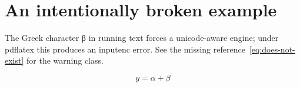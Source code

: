 \documentclass{article}
\begin{document}
\section{An intentionally broken example}

The Greek character β in running text forces a unicode-aware engine;
under pdflatex this produces an inputenc error.  See the missing
reference~\ref{eq:does-not-exist} for the warning class.

\begin{equation}
  y = \alpha + \beta
\end{equation}
\end{document}
